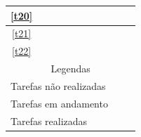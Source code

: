 \begin{table}[!htbp]
\begin{tabular}{|c|c|c|c|c|c|c|c|c|c|c|}
      \hline
      \ref{t20}&&&&&&&&\cellcolor{red}&\cellcolor{red}&\\
      \hline
      \ref{t21}&&&&&&&&&\cellcolor{red}&\cellcolor{red}\\
      \hline
      \ref{t22}&&&&&&&&\cellcolor{red}&\cellcolor{red}&\cellcolor{red}\\
      \hline
      \multicolumn{11}{|c|}{Legendas}\\ \hline
      \multicolumn{10}{|l|}{Tarefas não realizadas} &\cellcolor{red}\\
      \hline
      \multicolumn{10}{|l|}{Tarefas em andamento} &\cellcolor{yellow}\\
      \hline
      \multicolumn{10}{|l|}{Tarefas realizadas}&\cellcolor{green}\\
      \hline
      \end{tabular}
  \end{table}
